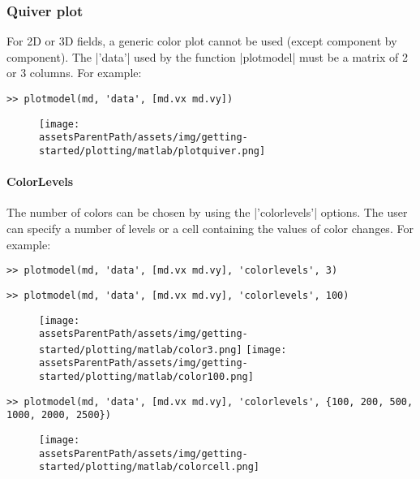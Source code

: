\subsubsection{Quiver plot}%
For 2D or 3D fields, a generic color plot cannot be used (except component by component). The \lstinlinebg|'data'| used by the function \lstinlinebg|plotmodel| must be a matrix of 2 or 3 columns. For example:
\begin{lstlisting}
>> plotmodel(md, 'data', [md.vx md.vy])
\end{lstlisting}
\begin{figure}[H]
	\begin{center}
		\texttt{[image: \\assetsParentPath/assets/img/getting-started/plotting/matlab/plotquiver.png]}
	\end{center}
\end{figure}

\paragraph{ColorLevels}
The number of colors can be chosen by using the \lstinlinebg|'colorlevels'| options. The user can specify a number of levels or a cell containing the values of color changes. For example:
\begin{lstlisting}
>> plotmodel(md, 'data', [md.vx md.vy], 'colorlevels', 3)
\end{lstlisting}
\begin{lstlisting}
>> plotmodel(md, 'data', [md.vx md.vy], 'colorlevels', 100)
\end{lstlisting}
\begin{figure}[H]
	\begin{center}
		\texttt{[image: \\assetsParentPath/assets/img/getting-started/plotting/matlab/color3.png]}
		\texttt{[image: \\assetsParentPath/assets/img/getting-started/plotting/matlab/color100.png]}
	\end{center}
\end{figure}
\begin{lstlisting}
>> plotmodel(md, 'data', [md.vx md.vy], 'colorlevels', {100, 200, 500, 1000, 2000, 2500})
\end{lstlisting}
\begin{figure}[H]
	\begin{center}
		\texttt{[image: \\assetsParentPath/assets/img/getting-started/plotting/matlab/colorcell.png]}
	\end{center}
\end{figure}

